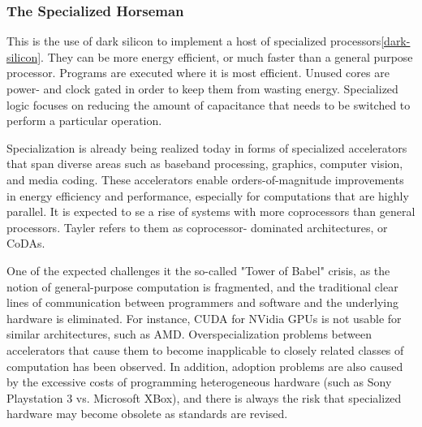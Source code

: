 
\subsubsection{The Specialized Horseman}
This is the use of dark silicon to implement a host of specialized processors\ref{dark-silicon}.
They can be more energy efficient, or much faster than a general purpose processor.
Programs are executed where it is most efficient.
Unused cores are power- and clock gated in order to keep them from wasting energy.
Specialized logic focuses on reducing the amount of capacitance that needs to be switched to perform a particular operation.

Specialization is already being realized today in forms of specialized accelerators that span diverse areas such as baseband processing, graphics, computer vision, and media coding.
These accelerators enable orders-of-magnitude improvements in energy efficiency and performance, especially for computations that are highly parallel.
It is expected to se a rise of systems with more coprocessors than general processors.
Tayler refers to them as coprocessor- dominated architectures, or CoDAs.

One of the expected challenges it the so-called "Tower of Babel" crisis, as the notion of general-purpose computation is fragmented, and the traditional clear lines of communication between programmers and software and the underlying hardware is eliminated.
For instance, CUDA for NVidia GPUs is not usable for similar architectures, such as AMD.
Overspecialization problems between accelerators that cause them to become inapplicable to closely related classes of computation has been observed.
In addition, adoption problems are also caused by the excessive costs of programming heterogeneous hardware (such as Sony Playstation 3 vs. Microsoft XBox), and there is always the risk that specialized hardware may become obsolete as standards are revised.

